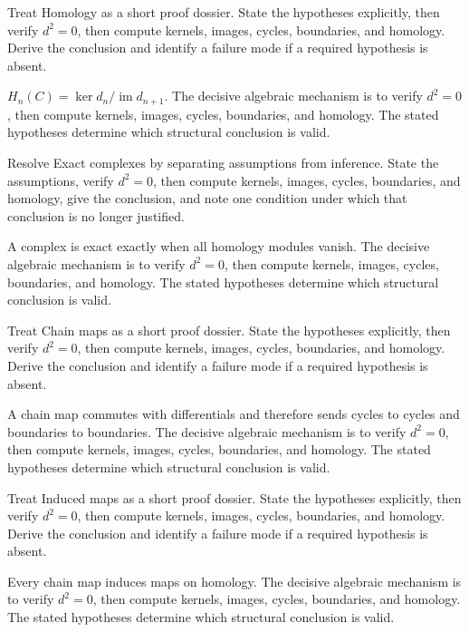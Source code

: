 \begin{problem}\label{prob:v22-problem-03}
Treat Homology as a short proof dossier. State the hypotheses explicitly, then verify \(d^2=0\), then compute kernels, images, cycles, boundaries, and homology. Derive the conclusion and identify a failure mode if a required hypothesis is absent.
\end{problem}
\begin{solution}
$H_n(C)=\ker d_n/\operatorname{im}d_{n+1}$. The decisive algebraic mechanism is to verify \(d^2=0\), then compute kernels, images, cycles, boundaries, and homology. The stated hypotheses determine which structural conclusion is valid.
\end{solution}

\begin{problem}\label{prob:v22-problem-04}
Resolve Exact complexes by separating assumptions from inference. State the assumptions, verify \(d^2=0\), then compute kernels, images, cycles, boundaries, and homology, give the conclusion, and note one condition under which that conclusion is no longer justified.
\end{problem}
\begin{solution}
A complex is exact exactly when all homology modules vanish. The decisive algebraic mechanism is to verify \(d^2=0\), then compute kernels, images, cycles, boundaries, and homology. The stated hypotheses determine which structural conclusion is valid.
\end{solution}

\begin{problem}\label{prob:v22-problem-05}
Treat Chain maps as a short proof dossier. State the hypotheses explicitly, then verify \(d^2=0\), then compute kernels, images, cycles, boundaries, and homology. Derive the conclusion and identify a failure mode if a required hypothesis is absent.
\end{problem}
\begin{solution}
A chain map commutes with differentials and therefore sends cycles to cycles and boundaries to boundaries. The decisive algebraic mechanism is to verify \(d^2=0\), then compute kernels, images, cycles, boundaries, and homology. The stated hypotheses determine which structural conclusion is valid.
\end{solution}

\begin{problem}\label{prob:v22-problem-06}
Treat Induced maps as a short proof dossier. State the hypotheses explicitly, then verify \(d^2=0\), then compute kernels, images, cycles, boundaries, and homology. Derive the conclusion and identify a failure mode if a required hypothesis is absent.
\end{problem}
\begin{solution}
Every chain map induces maps on homology. The decisive algebraic mechanism is to verify \(d^2=0\), then compute kernels, images, cycles, boundaries, and homology. The stated hypotheses determine which structural conclusion is valid.
\end{solution}

